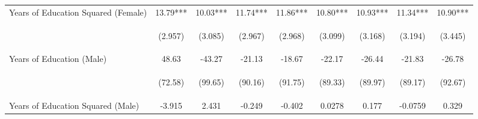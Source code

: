 \begin{landscape}
\begin{table}[htpb!]
\begin{center}
\begin{tabular}{lcccccccc}
Years of Education Squared (Female) &13.79***&10.03***&11.74***&11.86***&10.80***&10.93***&11.34***&10.90***\\
&\begin{footnotesize}(2.957)\end{footnotesize}&\begin{footnotesize}(3.085)\end{footnotesize}&\begin{footnotesize}(2.967)\end{footnotesize}&\begin{footnotesize}(2.968)\end{footnotesize}&\begin{footnotesize}(3.099)\end{footnotesize}&\begin{footnotesize}(3.168)\end{footnotesize}&\begin{footnotesize}(3.194)\end{footnotesize}&\begin{footnotesize}(3.445)\end{footnotesize}\\
Years of Education (Male) &48.63&-43.27&-21.13&-18.67&-22.17&-26.44&-21.83&-26.78\\
&\begin{footnotesize}(72.58)\end{footnotesize}&\begin{footnotesize}(99.65)\end{footnotesize}&\begin{footnotesize}(90.16)\end{footnotesize}&\begin{footnotesize}(91.75)\end{footnotesize}&\begin{footnotesize}(89.33)\end{footnotesize}&\begin{footnotesize}(89.97)\end{footnotesize}&\begin{footnotesize}(89.17)\end{footnotesize}&\begin{footnotesize}(92.67)\end{footnotesize}\\
Years of Education Squared (Male) &-3.915&2.431&-0.249&-0.402&0.0278&0.177&-0.0759&0.329\\

\end{tabular}
\end{center}
\end{table}
\end{landscape}
